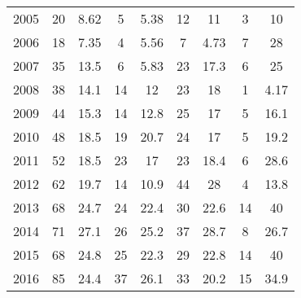 \begin{table}[htbp]
\begin{tabular}{l*{8}{c}}
2005      &       20&     8.62&        5&     5.38&       12&       11&        3&       10\\
2006      &       18&     7.35&        4&     5.56&        7&     4.73&        7&       28\\
2007      &       35&     13.5&        6&     5.83&       23&     17.3&        6&       25\\
2008      &       38&     14.1&       14&       12&       23&       18&        1&     4.17\\
2009      &       44&     15.3&       14&     12.8&       25&       17&        5&     16.1\\
2010      &       48&     18.5&       19&     20.7&       24&       17&        5&     19.2\\
2011      &       52&     18.5&       23&       17&       23&     18.4&        6&     28.6\\
2012      &       62&     19.7&       14&     10.9&       44&       28&        4&     13.8\\
2013      &       68&     24.7&       24&     22.4&       30&     22.6&       14&       40\\
2014      &       71&     27.1&       26&     25.2&       37&     28.7&        8&     26.7\\
2015      &       68&     24.8&       25&     22.3&       29&     22.8&       14&       40\\
2016      &       85&     24.4&       37&     26.1&       33&     20.2&       15&     34.9\\
\hline\hline
\end{tabular}
\end{table}
